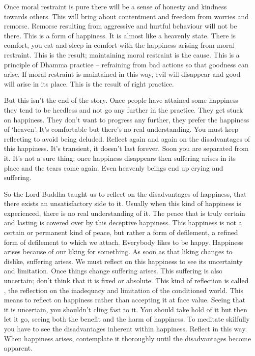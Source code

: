 Once moral restraint is pure there will be a sense of honesty and kindness towards others. This will bring about contentment and freedom from worries and remorse. Remorse resulting from aggressive and hurtful behaviour will not be there. This is a form of happiness. It is almost like a heavenly state. There is comfort, you eat and sleep in comfort with the happiness arising from moral restraint. This is the result; maintaining moral restraint is the cause. This is a principle of Dhamma practice -- refraining from bad actions so that goodness can arise. If moral restraint is maintained in this way, evil will disappear and good will arise in its place. This is the result of right practice. 

But this isn't the end of the story. Once people have attained some happiness they tend to be heedless and not go any further in the practice. They get stuck on happiness. They don't want to progress any further, they prefer the happiness of `heaven'. It's comfortable but there's no real understanding. You must keep reflecting to avoid being deluded. Reflect again and again on the disadvantages of this happiness. It's transient, it doesn't last forever. Soon you are separated from it. It's not a sure thing; once happiness disappears then suffering arises in its place and the tears come again. Even heavenly beings end up crying and suffering. 

So the Lord Buddha taught us to reflect on the disadvantages of happiness, that there exists an unsatisfactory side to it. Usually when this kind of happiness is experienced, there is no real understanding of it. The peace that is truly certain and lasting is covered over by this deceptive happiness. This happiness is not a certain or permanent kind of peace, but rather a form of defilement, a refined form of defilement to which we attach. Everybody likes to be happy. Happiness arises because of our liking for something. As soon as that liking changes to dislike, suffering arises. We must reflect on this happiness to see its uncertainty and limitation. Once things change suffering arises. This suffering is also uncertain; don't think that it is fixed or absolute. This kind of reflection is called , the reflection on the inadequacy and limitation of the conditioned world. This means to reflect on happiness rather than accepting it at face value. Seeing that it is uncertain, you shouldn't cling fast to it. You should take hold of it but then let it go, seeing both the benefit and the harm of happiness. To meditate skilfully you have to see the disadvantages inherent within happiness. Reflect in this way. When happiness arises, contemplate it thoroughly until the disadvantages become apparent. 


